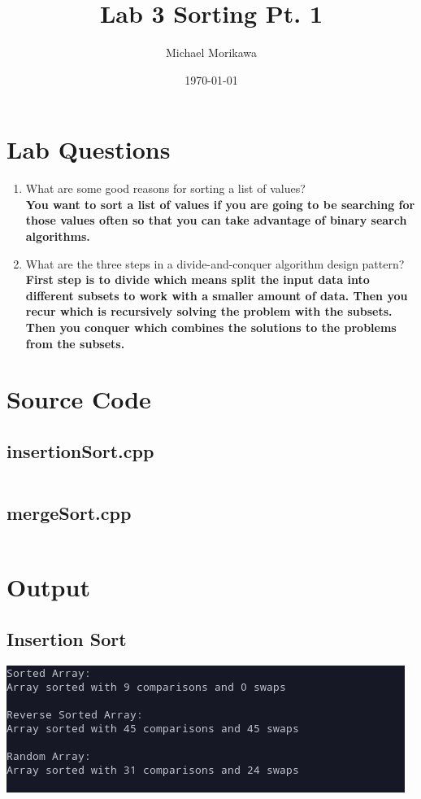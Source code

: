 \documentclass{article}
\title{Lab 3 Sorting Pt. 1}
\author{Michael Morikawa}
\date{\today}
\begin{document}
    \maketitle
    \section{Lab Questions}
    \begin{enumerate}[label=\textbf{Question \arabic*}]
        \item What are some good reasons for sorting a list of values? \\
        \textbf{You want to sort a list of values if you are going to be searching for
        those values often so that you can take advantage of binary search algorithms.}
        \item What are the three steps in a divide-and-conquer algorithm design pattern?\\
        \textbf{First step is to divide which means split the input data into different 
        subsets to work with a smaller amount of data. Then you recur which is recursively
         solving the problem with the subsets. Then you conquer which combines the solutions to
         the problems from the subsets.}
    \end{enumerate}

    \section{Source Code}
    \subsection{insertionSort.cpp}
    \inputminted{c++}{../src/insertionSort.cpp}

    \subsection{mergeSort.cpp}
    \inputminted{c++}{../src/mergeSort.cpp}
    \section{Output}
    \subsection{Insertion Sort}
    \includegraphics[]{insertionSort.png}
\end{document}
